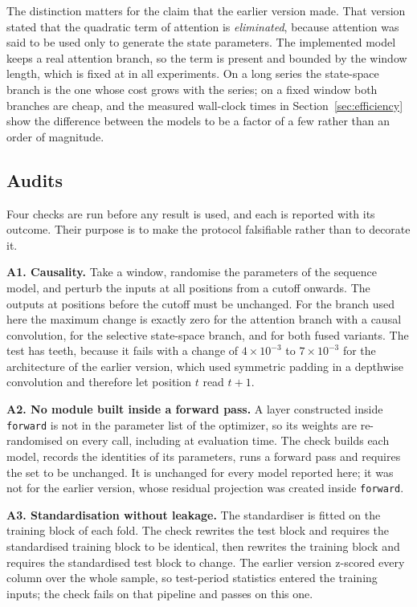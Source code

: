 \documentclass[pdflatex,sn-mathphys-ay]{sn-jnl}
\theoremstyle{thmstyleone}%
\theoremstyle{thmstyletwo}%
\theoremstyle{thmstyletwo}%
\begin{document}
The distinction matters for the claim that the earlier version made. That version stated that the
quadratic term of attention is \emph{eliminated}, because attention was said to be used only to
generate the state parameters. The implemented model keeps a real attention branch, so the term is
present and bounded by the window length, which is fixed at \seqLen{} in all experiments. On a
long series the state-space branch is the one whose cost grows with the series; on a fixed window
both branches are cheap, and the measured wall-clock times in Section~\ref{sec:efficiency} show the
difference between the models to be a factor of a few rather than an order of magnitude.

\subsection{Audits}\label{sec:audits}

Four checks are run before any result is used, and each is reported with its outcome. Their purpose
is to make the protocol falsifiable rather than to decorate it.

\textbf{A1. Causality.} Take a window, randomise the parameters of the sequence model, and perturb
the inputs at all positions from a cutoff onwards. The outputs at positions before the cutoff must
be unchanged. For the branch used here the maximum change is exactly zero for the attention branch
with a causal convolution, for the selective state-space branch, and for both fused variants. The
test has teeth, because it fails with a change of $4\times10^{-3}$ to $7\times10^{-3}$ for the
architecture of the earlier version, which used symmetric padding in a depthwise convolution and
therefore let position $t$ read $t+1$.

\textbf{A2. No module built inside a forward pass.} A layer constructed inside \texttt{forward} is
not in the parameter list of the optimizer, so its weights are re-randomised on every call,
including at evaluation time. The check builds each model, records the identities of its parameters,
runs a forward pass and requires the set to be unchanged. It is unchanged for every model reported
here; it was not for the earlier version, whose residual projection was created inside
\texttt{forward}.

\textbf{A3. Standardisation without leakage.} The standardiser is fitted on the training block of
each fold. The check rewrites the test block and requires the standardised training block to be
identical, then rewrites the training block and requires the standardised test block to change. The
earlier version z-scored every column over the whole sample, so test-period statistics entered the
training inputs; the check fails on that pipeline and passes on this one.
\end{document}
